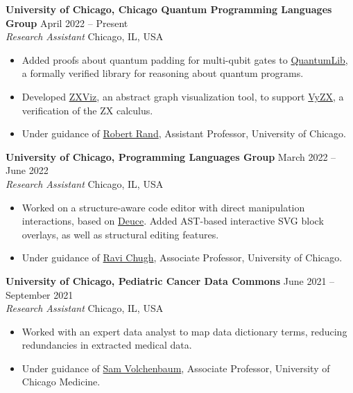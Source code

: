 \documentclass[10pt]{res} %
\begin{document}
\begin{resume}
{\bf University of Chicago, Chicago Quantum Programming Languages Group} \hfill April 2022 -- Present \\ 
{\sl Research Assistant} \hfill Chicago, IL, USA
\begin{itemize} \itemsep -2pt
    \item Added proofs about quantum padding for multi-qubit gates to \href{https://github.com/inQWIRE/QuantumLib}{QuantumLib}, a formally verified library for reasoning about quantum programs. 
    \item Developed \href{https://github.com/inQWIRE/ViZX}{ZXViz}, an abstract graph visualization tool, to support \href{https://github.com/inQWIRE/VyZX}{VyZX}, a verification of the ZX calculus. 
    \item Under guidance of \href{https://rand.cs.uchicago.edu/}{Robert Rand}, Assistant Professor, University of Chicago.
\end{itemize}

{\bf University of Chicago, Programming Languages Group} \hfill March 2022 -- June 2022 \\ 
{\sl Research Assistant} \hfill Chicago, IL, USA
\begin{itemize} \itemsep -2pt
    \item Worked on a structure-aware code editor with direct manipulation interactions, based on \href{http://ravichugh.github.io/sketch-n-sketch/blog/06-deuce-user-study.html}{Deuce}. Added AST-based interactive SVG block overlays, as well as structural editing features.
    \item Under guidance of \href{http://people.cs.uchicago.edu/~rchugh/}{Ravi Chugh}, Associate Professor, University of Chicago.
\end{itemize}

{\bf University of Chicago, Pediatric Cancer Data Commons} \hfill June 2021 -- September 2021 \\
{\sl Research Assistant} \hfill Chicago, IL, USA
\begin{itemize} \itemsep -2pt
    \item Worked with an expert data analyst to map data dictionary terms, reducing redundancies in extracted medical data.
    \item Under guidance of \href{https://voices.uchicago.edu/volchenboum/}{Sam Volchenbaum}, Associate Professor, University of Chicago Medicine.
\end{itemize}


\end{resume}
\end{document}
